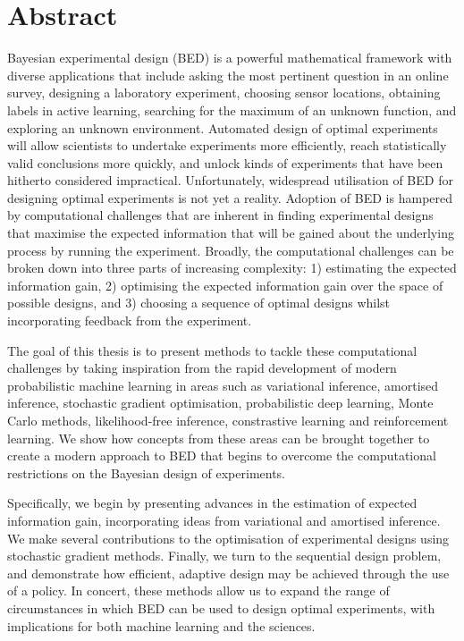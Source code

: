 \documentclass[a4paper, 10pt]{report}
\theoremstyle{plain}
\begin{document}
	
	
	
	\newpage
	\chapter*{Abstract}
	Bayesian experimental design (BED) is a powerful mathematical framework with diverse applications that include asking the most pertinent question in an online survey, designing a laboratory experiment, choosing sensor locations, obtaining labels in active learning, searching for the maximum of an unknown function, and exploring an unknown environment.
	Automated design of optimal experiments will allow scientists to undertake experiments more efficiently, reach statistically valid conclusions more quickly, and unlock kinds of experiments that have been hitherto considered impractical.
	Unfortunately, widespread utilisation of BED for designing optimal experiments is not yet a reality.
	Adoption of BED is hampered by computational challenges that are inherent in finding experimental designs that maximise the expected information that will be gained about the underlying process by running the experiment.
	Broadly, the computational challenges can be broken down into three parts of increasing complexity: 1) estimating the expected information gain, 2) optimising the expected information gain over the space of possible designs, and 3) choosing a sequence of optimal designs whilst incorporating feedback from the experiment.
	
	The goal of this thesis is to present methods to tackle these computational challenges by taking inspiration from the rapid development of modern probabilistic machine learning in areas such as variational inference, amortised inference, stochastic gradient optimisation, probabilistic deep learning, Monte Carlo methods, likelihood-free inference, constrastive learning and reinforcement learning.
	We show how concepts from these areas can be brought together to create a modern approach to BED that begins to overcome the computational restrictions on the Bayesian design of experiments.
	
	Specifically, we begin by presenting advances in the estimation of expected information gain, incorporating ideas from variational and amortised inference.
	We make several contributions to the optimisation of experimental designs using stochastic gradient methods.
	Finally, we turn to the sequential design problem, and demonstrate how efficient, adaptive design may be achieved through the use of a policy.
	In concert, these methods allow us to expand the range of circumstances in which BED can be used to design optimal experiments, with implications for both machine learning and the sciences.
\end{document}
